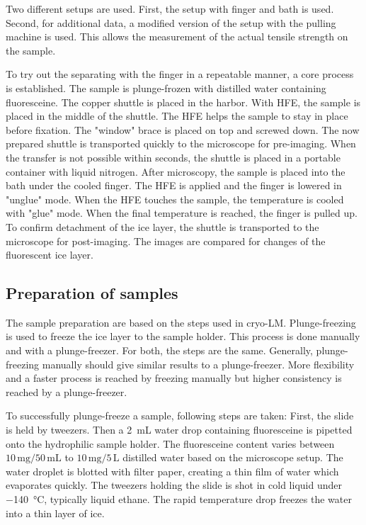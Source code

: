 Two different setups are used. First, the setup with finger and bath is used. Second, for additional data, a modified version of the setup with the pulling machine is used. This allows the measurement of the actual tensile strength on the sample. 

To try out the separating with the finger in a repeatable manner, a core process is established. The sample is plunge-frozen with distilled water containing fluoresceine. The copper shuttle is placed in the harbor. With HFE, the sample is placed in the middle of the shuttle. The HFE helps the sample to stay in place before fixation. The "window" brace is placed on top and screwed down. The now prepared shuttle is transported quickly to the microscope for pre-imaging. When the transfer is not possible within seconds, the shuttle is placed in a portable container with liquid nitrogen. After microscopy, the sample is placed into the bath under the cooled finger. The HFE is applied and the finger is lowered in "unglue" mode. When the HFE touches the sample, the temperature is cooled with "glue" mode. When the final temperature is reached, the finger is pulled up. To confirm detachment of the ice layer, the shuttle is transported to the microscope for post-imaging. The images are compared for changes of the fluorescent ice layer.

\subsection{Preparation of samples}

The sample preparation are based on the steps used in cryo-LM. Plunge-freezing is used to freeze the ice layer to the sample holder. This process is done manually and with a plunge-freezer. For both, the steps are the same. Generally, plunge-freezing manually should give similar results to a plunge-freezer. More flexibility and a faster process is reached by freezing manually but higher consistency is reached by a plunge-freezer.

To successfully plunge-freeze a sample, following steps are taken: First, the slide is held by tweezers. Then a \SI{2}{\milli\liter} water drop containing fluoresceine is pipetted onto the hydrophilic sample holder. The fluoresceine content varies between $10\,\si{\milli\gram}/50\,\si{\milli\liter}$ to $10\,\si{\milli\gram}/5\,\si{\liter}$ distilled water based on the microscope setup. The water droplet is blotted with filter paper, creating a thin film of water which evaporates quickly. The tweezers holding the slide is shot in cold liquid under \SI{-140}{\degreeCelsius}, typically liquid ethane. The rapid temperature drop freezes the water into a thin layer of ice.

